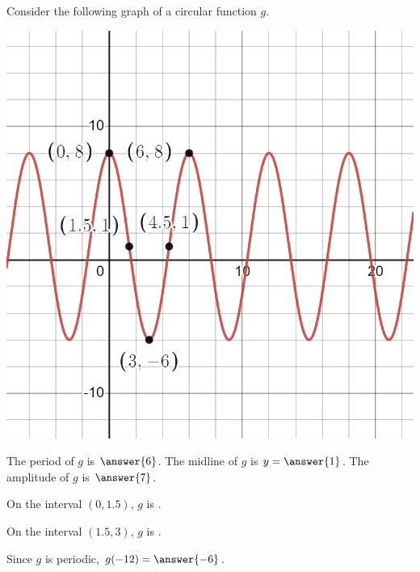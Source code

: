 \documentclass{ximera}
\author{Kenneth Berglund}
\begin{document}
\begin{exercise}
Consider the following graph of a circular function $g$.

\includegraphics[width=1\linewidth]{ex12.png}

The period of $g$ is $\answer{6}$. The midline of $g$ is $y = \answer{1}$. The amplitude of $g$ is $\answer{7}$.

On the interval $(0, 1.5)$, $g$ is .

On the interval $(1.5, 3)$, $g$ is .

Since $g$ is periodic, $g(-12) = \answer{-6}$. 


\end{exercise}
\end{document}
